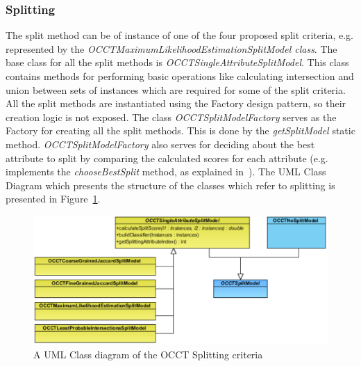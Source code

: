 \documentclass[a4paper,12pt]{article}
\begin{document}
\begin{spacing}{1.5}
\subsubsection{Splitting}\label{sec:splitting}
The split method can be of instance of one of the four proposed split criteria, e.g. represented by the {\em OCCTMaximumLikelihoodEstimationSplitModel class}. The base class for all the split methods is {\em OCCTSingleAttributeSplitModel}. This class contains methods for performing basic operations like calculating intersection and union between sets of instances which are required for some of the split criteria. All the split methods are instantiated using the Factory design pattern, so their creation logic is not exposed. The class {\em OCCTSplitModelFactory} serves as the Factory for creating all the  split methods. This is done by the {\em getSplitModel} static method. {\em OCCTSplitModelFactory} also serves for deciding about the best attribute to split by comparing the calculated scores for each attribute (e.g. implements the {\em chooseBestSplit} method, as explained  in~\cite{dror2011thesis,dror2014occt}). The UML Class Diagram which presents the structure of the classes which refer to splitting is presented in Figure~\ref{fig:splitting}.
\vspace{0.5cm}
\begin{figure}[!h]
    \centering
    \includegraphics[width=1\textwidth]{Figures/ClassDiagrams/PDF/SplitMethods.pdf}
    \caption{A UML Class diagram of the OCCT Splitting criteria}
    \label{fig:splitting}
\end{figure}


\end{spacing}
\end{document}
